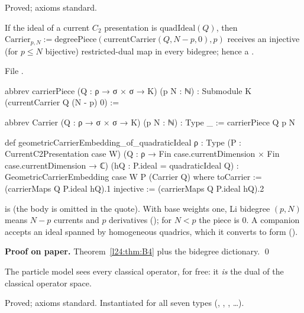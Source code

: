 \begin{status}
Proved; axioms standard.
\end{status}

\begin{theorem}\label{l24:thm:geom}
If the ideal of a current $C_2$ presentation is $\mathrm{quadIdeal}(Q)$, then
$\mathrm{Carrier}_{p,N}:=\mathrm{degreePiece}(\mathrm{currentCarrier}(Q,N-p,0),p)$ receives an injective (for
$p\le N$ bijective) restricted-dual map in every bidegree; hence a .
\end{theorem}
\noindent File .
\begin{leancode}
abbrev carrierPiece (Q : ρ → σ × σ → K) (p N : ℕ) : Submodule K (currentCarrier Q (N - p) 0) :=

abbrev Carrier (Q : ρ → σ × σ → K) (p N : ℕ) : Type _ := carrierPiece Q p N

def geometricCarrierEmbedding_of_quadraticIdeal {ρ : Type}
    (P : CurrentC2Presentation case W)
    (Q : ρ → Fin case.currentDimension × Fin case.currentDimension → ℂ)
    (hQ : P.ideal = quadraticIdeal Q) :
    GeometricCarrierEmbedding case W P (Carrier Q) where
  toCarrier := (carrierMaps Q P.ideal hQ).1
  injective := (carrierMaps Q P.ideal hQ).2
\end{leancode}

\begin{dictionary}
 is  (the body is omitted in the
quote). With base weights one, Li bidegree $(p,N)$ means $N-p$ currents and $p$ derivatives
(); for $N<p$ the piece is $0$. A companion
 accepts an ideal spanned by homogeneous quadrics, which it converts
to  form ().
\end{dictionary}

\textbf{Proof on paper.} Theorem~\ref{l24:thm:B4} plus the bidegree dictionary. \qed

\begin{physics}
The particle model sees every classical operator, for free: it \emph{is} the dual of the classical operator
space.
\end{physics}

\begin{status}
Proved; axioms standard. Instantiated for all seven types
(, , , …).
\end{status}

